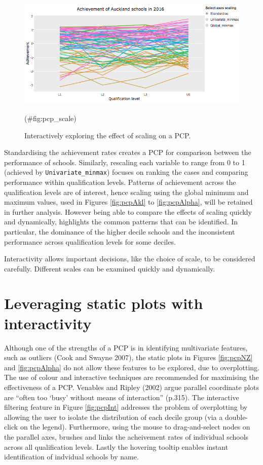 \documentclass[]{book}
\theoremstyle{definition}
\theoremstyle{definition}
\theoremstyle{definition}
\theoremstyle{remark}
\begin{document}
\begin{figure}[center]
\includegraphics[width=700px]{files/pcp_scale} \caption{Interactively exploring the effect of scaling on a PCP.}(\#fig:pcp_scale)
\end{figure}

Standardising the achievement rates creates a PCP for comparison between
the performance of schools. Similarly, rescaling each variable to range
from 0 to 1 (achieved by \texttt{Univariate\_minmax}) focuses on ranking
the cases and comparing performance within qualification levels.
Patterns of achievement across the qualification levels are of interest,
hence scaling using the global minimum and maximum values, used in
Figures \ref{fig:pcpAkl} to \ref{fig:pcpAlpha}, will be retained in
further analysis. However being able to compare the effects of scaling
quickly and dynamically, highlights the common patterns that can be
identified. In particular, the dominance of the higher decile schools
and the inconsistent performance across qualification levels for some
deciles.

\begin{boxed}
Interactivity allows important decisions, like the choice of scale, to
be considered carefully. Different scales can be examined quickly and
dynamically.
\end{boxed}

\section{Leveraging static plots with
interactivity}\label{leveraging-static-plots-with-interactivity}

Although one of the strengths of a PCP is in identifying multivariate
features, such as outliers (Cook and Swayne 2007), the static plots in
Figures \ref{fig:pcpNZ} and \ref{fig:pcpAlpha} do not allow these
features to be explored, due to overplotting. The use of colour and
interactive techniques are recommended for maximising the effectiveness
of a PCP. Venables and Ripley (2002) argue parallel coordinate plots are
``often too `busy' without means of interaction'' (p.315). The
interactive filtering feature in Figure \ref{fig:pcpInt} addresses the
problem of overplotting by allowing the user to isolate the distribution
of each decile group (via a double-click on the legend). Furthermore,
using the mouse to drag-and-select nodes on the parallel axes, brushes
and links the acheivement rates of individual schools across all
qualification levels. Lastly the hovering tooltip enables instant
identification of indvidual schools by name.
\end{document}
